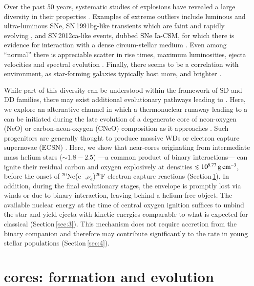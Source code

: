 \documentclass{aa}
\begin{document}
Over the past 50 years, systematic studies of \ia explosions have revealed a large
diversity in their properties \citep{Taubenberger:2017hoo}. 
Examples of extreme outliers include luminous 
\citep[e.g. SN\,1991T;][]{filippenko1992} and ultra-luminous  
\citep[e.g. SNLS-03D3bb;][]{Howell:2006vn} SNe, SN\,1991bg-like transients which
are faint and rapidly evolving \citep{ruiz-lapuente1993},  
and SN\,2012ca-like events, dubbed SNe Ia-CSM, for which 
there is evidence for interaction with a dense circum-stellar 
medium \citep{Bochenek:2017vok}. 
Even among ``normal'' \ias there is appreciable
scatter in rise times, maximum luminosities, ejecta velocities and spectral evolution   
\citep[][]{Livio:2018rue}. 
Finally, there seems to be a correlation with environment, 
as star-forming  galaxies typically  host more,  and brighter \ias \citep{Maoz:2013hna}. 


While part of this diversity can be understood within the framework of SD and DD 
families, there may exist additional 
evolutionary pathways leading to \ias. 
Here, we explore an alternative channel in which a thermonuclear runaway leading to a \ia can be initiated during the late evolution of a degenerate core of neon-oxygen 
(NeO) or carbon-neon-oxygen (CNeO) composition as it  approaches  \mch. 
Such progenitors are generally thought to produce massive WDs or     
electron capture supernovae (ECSN)  
\citep[e.g.,][]{nomoto1991,gutierrez1996,Takahashi:2013ena}.  
Here, we show that near-\mch \one cores originating from intermediate mass helium stars ($\sim 1.8-2.5$\msun) ---a common product of binary interactions--- can ignite their residual carbon and oxygen explosively at  
densities $\lesssim 10^{9.77}\mathrm{\,g\,cm^{-3}}$, 
before the onset of {\rm $^{20}$Ne(e$^-$,$\nu_e$)$^{20}$F} 
electron capture reactions (Section\,\ref{sec:2}). 
In addition, during the final evolutionary stages, the envelope is promptly lost via winds or due to binary interaction, leaving behind a helium-free object.  
The available nuclear energy at the time of central oxygen ignition suffices to unbind the star and yield ejecta with kinetic energies comparable to what is expected for classical \ias (Section\,\ref{sec:3}).
 This mechanism  does not require accretion from the binary companion and 
 therefore may contribute significantly to the \ia  rate in young stellar populations (Section\,\ref{sec:4}). 
 

\section{\one cores: formation and evolution}\label{sec:2}
\end{document}
